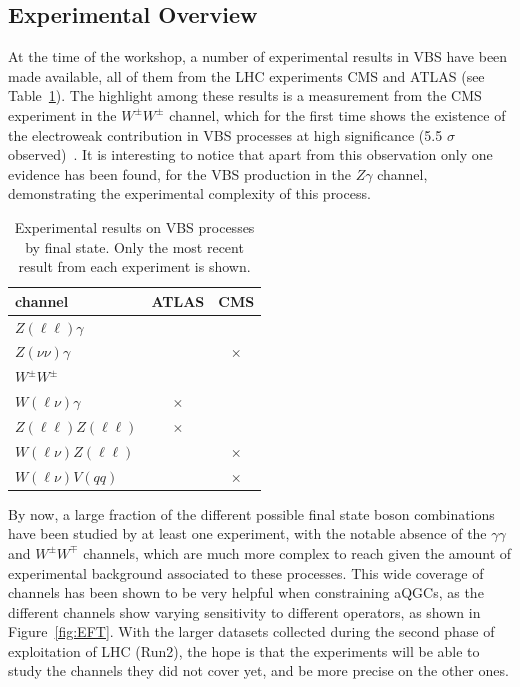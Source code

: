 \label{WG2}

\subsection{Experimental Overview}
 
At the time of the workshop, a number of experimental results in VBS have been made available, all of them from the LHC experiments CMS and ATLAS (see Table~\ref{tab:wg2:expres}). The highlight among these results is a measurement from the CMS experiment in the $W^\pm W^\pm$ channel, which for the first time shows the existence of the electroweak contribution in VBS processes at high significance (5.5 $\sigma$ observed)~\cite{CMS:2017adb}. It is interesting to notice that apart from this observation only one evidence has been found, for the VBS production in the $Z\gamma$ channel, demonstrating the experimental complexity of this process. 

\begin{table}[htb]
\centering
\begin{tabular}{|l|c|c|}
    \hline
    channel & ATLAS & CMS \\
    \hline
    $Z(\ell\ell)\gamma$ & \cite{Aaboud:2017pds} & \cite{Khachatryan:2017jub} \\
    $Z(\nu\nu)\gamma$ &  \cite{Aaboud:2017pds}& $\times$ \\
    $W^\pm W^\pm$ & \cite{Aaboud:2016ffv} & \cite{CMS:2017adb} \\
    $W(\ell\nu)\gamma$ & $\times$ & \cite{Khachatryan:2016vif} \\
    $Z(\ell\ell)Z(\ell\ell)$&  $\times$  & \cite{CMS-PAS-SMP-17-006} \\
    $W(\ell\nu)Z(\ell\ell)$ & \cite{Aad:2016ett} & $\times$ \\
    $W(\ell\nu)V(qq)$ & \cite{Aaboud:2016uuk} & $\times$ \\
    \hline
  \end{tabular}  
\caption{\label{tab:wg2:expres} Experimental results on VBS processes by final state. Only the most recent result from each experiment is shown.}
\end{table}

By now, a large fraction of the different possible final state boson combinations have been studied by at least one experiment, with the notable absence of the $\gamma\gamma$ and $W^\pm W^\mp$ channels, which are much more complex to reach given the amount of experimental background associated to these processes. This wide coverage of channels has been shown to be very helpful when constraining aQGCs, as the different channels show varying sensitivity to different operators, as shown in Figure~\ref{fig:EFT}.
With the larger datasets collected during the second phase of exploitation of LHC (Run2), the hope is that the experiments will be able to study the channels they did not cover yet, and be more precise on the other ones. 

